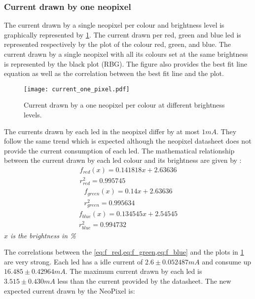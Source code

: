 \subsubsection{Current drawn by one neopixel} \label{current_one}
The current drawn by a single neopixel per colour and brightness level is graphically represented by \cref{fig:current_one_pixel}. The current drawn per red, green and blue led is represented respectively by the plot of the colour red, green, and blue. The current drawn by a single neopixel with all its colours set at the same brightness is represented by the black plot (RBG). The figure also provides the best fit line equation as well as the correlation between the best fit line and the plot.  
\begin{figure}[ht]
	\centering
	\texttt{[image: current\_one\_pixel.pdf]}
	\caption{Current drawn by a one neopixel per colour at different brightness levels.}
	\label{fig:current_one_pixel}
\end{figure}
The currents drawn by each led in the neopixel differ by at most $1mA$. They follow the same trend which is expected although the neopixel datasheet does not provide the current consumption of each led. The mathematical relationship between the current drawn by each led colour and its brightness are given by :
\begin{equation}
\label{eq:f_red}
\begin{multlined}
f_{red}(x) = 0.141818x+2.63636 \\
r^2_{red} = 0.995745
\end{multlined}
\end{equation} 
\begin{equation}
\label{eq:f_green}
\begin{multlined}
f_{green}(x) = 0.14x+2.63636 \\
r^2_{green} = 0.995634
\end{multlined}
\end{equation} 
\begin{equation}
\label{eq:f_blue}
\begin{multlined}
f_{blue}(x) = 0.134545x+2.54545 \\
r^2_{blue} = 0.994732
\end{multlined}
\end{equation} 
{
	\centering
	\textit{$x$ is the brightness in \%}\\
}

The correlations between the \cref{eq:f_red,eq:f_green,eq:f_blue} and the plots in \cref{fig:current_one_pixel} are very strong. Each led has a idle current of $2.6 \pm 0.052487 mA$ and consume up $16.485 \pm 0.42964 mA$. The maximum current drawn by each led is $3.515\pm0.430 mA$ less than the current provided by the datasheet. The new expected current drawn by the NeoPixel is:\\

